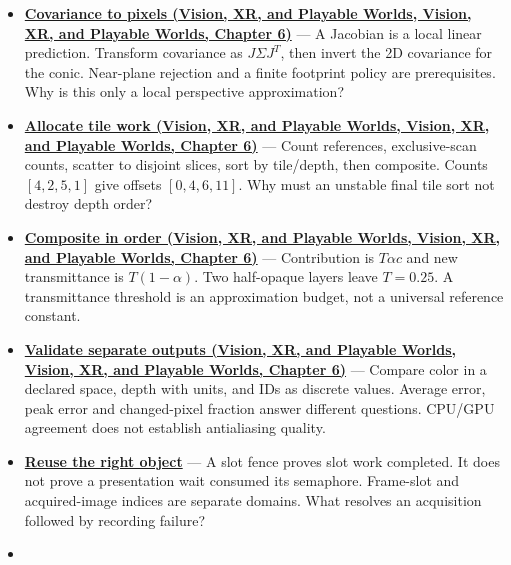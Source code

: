 \begin{itemize}
\item
  \textbf{\href{../07-Vision-XR-and-Playable-Worlds/main.pdf\#nameddest=04-visual-computing-ii-ch037-local-projection-turns-an-ellipsoid-into-a-screen-ellipse}{Covariance to pixels (Vision, XR, and Playable Worlds, Vision, XR, and Playable Worlds, Chapter 6)}} --- A Jacobian is a local linear prediction. Transform covariance as \(J\Sigma J^T\), then invert the 2D covariance for the conic. Near-plane rejection and a finite footprint policy are prerequisites. Why is this only a local perspective approximation?
\item
  \textbf{\href{../07-Vision-XR-and-Playable-Worlds/main.pdf\#nameddest=04-visual-computing-ii-ch037-from-ellipses-to-bounded-tile-work}{Allocate tile work (Vision, XR, and Playable Worlds, Vision, XR, and Playable Worlds, Chapter 6)}} --- Count references, exclusive-scan counts, scatter to disjoint slices, sort by tile/depth, then composite. Counts \([4,2,5,1]\) give offsets \([0,4,6,11]\). Why must an unstable final tile sort not destroy depth order?
\item
  \textbf{\href{../07-Vision-XR-and-Playable-Worlds/main.pdf\#nameddest=04-visual-computing-ii-ch037-figure-er1---footprint-compositing-order-and-storage-lifetime}{Composite in order (Vision, XR, and Playable Worlds, Vision, XR, and Playable Worlds, Chapter 6)}} --- Contribution is \(T\alpha c\) and new transmittance is \(T(1-\alpha)\). Two half-opaque layers leave \(T=0.25\). A transmittance threshold is an approximation budget, not a universal reference constant.
\item
  \textbf{\href{../07-Vision-XR-and-Playable-Worlds/main.pdf\#nameddest=04-visual-computing-ii-ch037-validation-should-isolate-representations-before-images}{Validate separate outputs (Vision, XR, and Playable Worlds, Vision, XR, and Playable Worlds, Chapter 6)}} --- Compare color in a declared space, depth with units, and IDs as discrete values. Average error, peak error and changed-pixel fraction answer different questions. CPU/GPU agreement does not establish antialiasing quality.
\item
  \textbf{\hyperref[01-foundations-i-ch011-follow-a-frame-slot-and-a-presentation-image-separately]{Reuse the right object}} --- A slot fence proves slot work completed. It does not prove a presentation wait consumed its semaphore. Frame-slot and acquired-image indices are separate domains. What resolves an acquisition followed by recording failure?
\item

\end{itemize}
